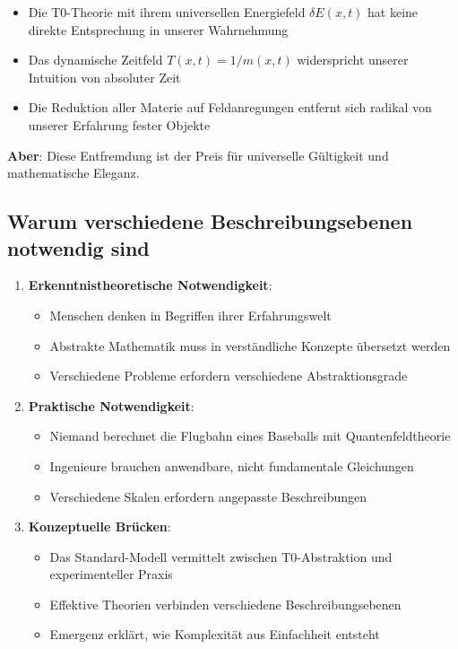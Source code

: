 \documentclass[12pt,a4paper]{article}
\begin{document}
	\begin{itemize}
		\item Die T0-Theorie mit ihrem universellen Energiefeld $\delta E(x,t)$ hat keine direkte Entsprechung in unserer Wahrnehmung
		\item Das dynamische Zeitfeld $T(x,t) = 1/m(x,t)$ widerspricht unserer Intuition von absoluter Zeit
		\item Die Reduktion aller Materie auf Feldanregungen entfernt sich radikal von unserer Erfahrung fester Objekte
	\end{itemize}
	
	\textbf{Aber}: Diese Entfremdung ist der Preis für universelle Gültigkeit und mathematische Eleganz.
	
	\subsection{Warum verschiedene Beschreibungsebenen notwendig sind}
	
	\begin{enumerate}
		\item \textbf{Erkenntnistheoretische Notwendigkeit}:
		\begin{itemize}
			\item Menschen denken in Begriffen ihrer Erfahrungswelt
			\item Abstrakte Mathematik muss in verständliche Konzepte übersetzt werden
			\item Verschiedene Probleme erfordern verschiedene Abstraktionsgrade
		\end{itemize}
		
		\item \textbf{Praktische Notwendigkeit}:
		\begin{itemize}
			\item Niemand berechnet die Flugbahn eines Baseballs mit Quantenfeldtheorie
			\item Ingenieure brauchen anwendbare, nicht fundamentale Gleichungen
			\item Verschiedene Skalen erfordern angepasste Beschreibungen
		\end{itemize}
		
		\item \textbf{Konzeptuelle Brücken}:
		\begin{itemize}
			\item Das Standard-Modell vermittelt zwischen T0-Abstraktion und experimenteller Praxis
			\item Effektive Theorien verbinden verschiedene Beschreibungsebenen
			\item Emergenz erklärt, wie Komplexität aus Einfachheit entsteht
		\end{itemize}
	\end{enumerate}
	
\end{document}
